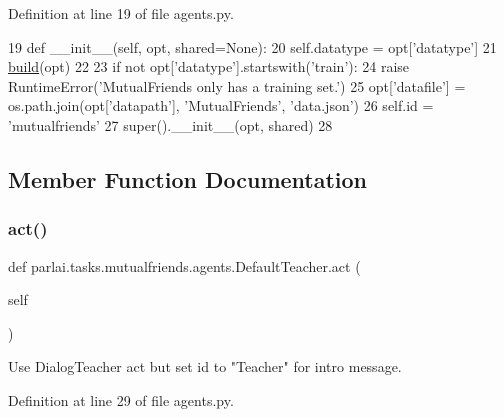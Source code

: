 Definition at line 19 of file agents.\+py.


\begin{DoxyCode}
19     \textcolor{keyword}{def }\_\_init\_\_(self, opt, shared=None):
20         self.datatype = opt[\textcolor{stringliteral}{'datatype'}]
21         \hyperlink{namespaceparlai_1_1mturk_1_1tasks_1_1talkthewalk_1_1download_a8c0fbb9b6dfe127cb8c1bd6e7c4e33fd}{build}(opt)
22 
23         \textcolor{keywordflow}{if} \textcolor{keywordflow}{not} opt[\textcolor{stringliteral}{'datatype'}].startswith(\textcolor{stringliteral}{'train'}):
24             \textcolor{keywordflow}{raise} RuntimeError(\textcolor{stringliteral}{'MutualFriends only has a training set.'})
25         opt[\textcolor{stringliteral}{'datafile'}] = os.path.join(opt[\textcolor{stringliteral}{'datapath'}], \textcolor{stringliteral}{'MutualFriends'}, \textcolor{stringliteral}{'data.json'})
26         self.id = \textcolor{stringliteral}{'mutualfriends'}
27         super().\_\_init\_\_(opt, shared)
28 
\end{DoxyCode}


\subsection{Member Function Documentation}
\mbox{\label{classparlai_1_1tasks_1_1mutualfriends_1_1agents_1_1DefaultTeacher_a83bc0a32365ef6d66bb217f33e21d652}} 
\subsubsection{\texorpdfstring{act()}{act()}}
{\footnotesize\ttfamily def parlai.\+tasks.\+mutualfriends.\+agents.\+Default\+Teacher.\+act (\begin{DoxyParamCaption}\item[{}]{self }\end{DoxyParamCaption})}

\begin{DoxyVerb}Use DialogTeacher act but set id to "Teacher" for intro message.
\end{DoxyVerb}
 

Definition at line 29 of file agents.\+py.


